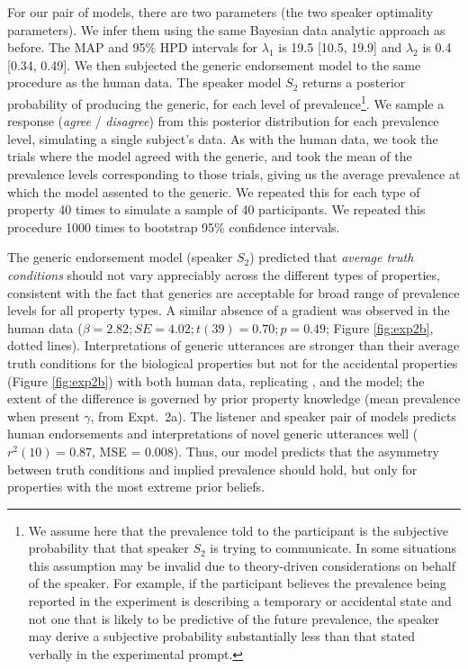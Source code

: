 \documentclass[12pt,letterpaper]{article}
\begin{document}
For our pair of models, there are two parameters (the two speaker optimality parameters).
We infer them using the same Bayesian data analytic approach as before. 
The MAP and 95\% HPD intervals for $\lambda_1$ is 19.5 [10.5, 19.9] and $\lambda_2$ is 0.4 [0.34, 0.49].
We then subjected the generic endorsement model to the same procedure as the human data. %
%
The speaker model $S_2$ returns a posterior probability of producing the generic, for each level of prevalence\footnote{We assume here that the prevalence told to the participant is the subjective probability that that speaker $S_2$ is trying to communicate. In some situations this assumption may be invalid due to theory-driven considerations on behalf of the speaker. For example, if the participant believes the prevalence being reported in the experiment is describing a temporary or accidental state and not one that is likely to be predictive of the future prevalence, the speaker may derive a subjective probability substantially less than that stated verbally in the experimental prompt.}. 
We sample a response (\emph{agree} / \emph{disagree}) from this posterior distribution for each prevalence level, simulating a single subject's data.
As with the human data, we took the trials where the model agreed with the generic, and took the mean of the prevalence levels corresponding to those trials, giving us the average prevalence at which the model assented to the generic.
We repeated this for each type of property 40 times to simulate a sample of 40 participants. 
We repeated this procedure 1000 times to bootstrap 95\% confidence intervals.

The generic endorsement model (speaker $S_2$) predicted that \emph{average truth conditions} should not vary appreciably across the different types of properties, consistent with the fact that generics are acceptable for broad range of prevalence levels for all property types.
A similar absence of a gradient was observed in the human data ($\beta = 2.82; SE = 4.02; t(39) = 0.70; p = 0.49$; Figure \ref{fig:exp2b}, dotted lines). 
Interpretations of generic utterances are stronger than their average truth conditions for the biological properties but not for the accidental properties (Figure \ref{fig:exp2b}) with both human data, replicating , and the model; the extent of the difference is governed by prior property knowledge (mean prevalence when present $\gamma$, from Expt.~2a).
The listener and speaker pair of models predicts human endorsements and interpretations of novel generic utterances well ($r^2(10) = 0.87$, MSE = 0.008).
Thus, our model predicts that the asymmetry between truth conditions and implied prevalence should hold, but only for properties with the most extreme prior beliefs.
\end{document}
